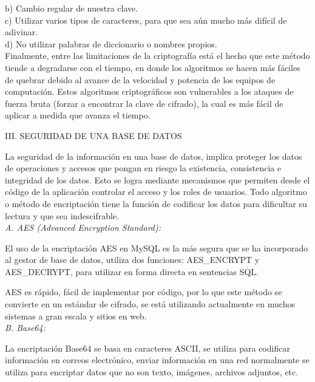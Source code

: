\documentclass[9pt,24pt,twocolumn]{article}
\begin{document}
{b)  Cambio regular de nuestra clave.}
\\

{c) Utilizar varios tipos de caracteres, para que sea aún mucho más difícil de adivinar.}
\\

{d)  No utilizar palabras de diccionario o nombres propios.}
\\

{Finalmente, entre las limitaciones de la criptografía está el hecho que este método tiende a degradarse con el tiempo, en donde los algoritmos se hacen más fáciles de quebrar debido al avance de la velocidad y potencia de los equipos de computación. Estos algoritmos criptográficos son vulnerables a los ataques de fuerza bruta (forzar a encontrar la clave de cifrado), la cual es más fácil de aplicar a medida que avanza el tiempo.}
\\

\begin{center}
{III. SEGURIDAD DE UNA BASE DE DATOS}
\end{center}

{La seguridad de la información en una base de datos, implica proteger los datos de operaciones y accesos que pongan en riesgo la existencia, consistencia e integridad de los datos.
Esto se logra mediante mecanismos que permiten desde el código de la aplicación controlar el acceso y los roles de usuarios. Todo algoritmo o método de encriptación tiene la función de codificar los datos para dificultar su lectura y que sea indescifrable.}
\\


\textit{A. AES (Advanced Encryption Standard):}

{El uso de la encriptación AES en MySQL es la más segura que se ha incorporado al gestor de base de datos, utiliza dos funciones: AES\_ENCRYPT y AES\_DECRYPT, para utilizar en forma directa en sentencias SQL.}

{AES es rápido, fácil de implementar por código, por lo que este método se convierte en un estándar de cifrado, se está utilizando actualmente en muchos sistemas a gran escala y sitios en web.}
\\

\textit{B. Base64:}

{La encriptación Base64 se basa en caracteres ASCII, se utiliza para codificar información en correos electrónico, enviar información en una red normalmente se utiliza para encriptar datos que no son texto, imágenes, archivos adjuntos, etc.}
\\
\end{document}
